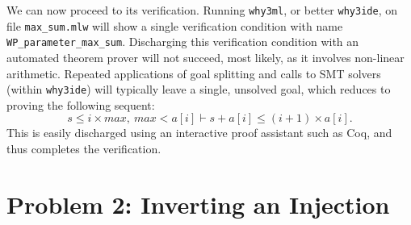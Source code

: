 We can now proceed to its verification.
Running \texttt{why3ml}, or better \texttt{why3ide}, on file
\verb|max_sum.mlw| will show a single verification condition with name
\verb|WP_parameter_max_sum|.
Discharging this verification condition with an automated theorem
prover will not succeed, most likely, as it involves non-linear
arithmetic. Repeated applications of goal splitting and calls to
SMT solvers (within \texttt{why3ide}) will typically leave a single,
unsolved goal, which reduces to proving the following sequent:
\begin{displaymath}
  s \le i \times max, ~ max < a[i] \vdash s + a[i] \le (i+1) \times a[i].
\end{displaymath}
This is easily discharged using an interactive proof assistant such as
Coq, and thus completes the verification.

\section{Problem 2: Inverting an Injection}

